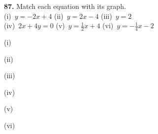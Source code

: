 \documentclass{ximera}
\begin{document}
\begin{problem}
\textbf{87.} Match each equation with its graph.
  \\[3pt]
  \hspace*{1.5em}
  (i)~$y = -2x + 4$ \qquad (ii)~$y = 2x - 4$ \qquad (iii)~$y = 2$
  \\[2pt]
  \hspace*{1.5em}
  (iv)~$2x + 4y = 0$ \qquad (v)~$y = \frac{1}{2}x + 4$ \qquad
  (vi)~$y = -\frac{1}{4}x - 2$

(i)

\begin{multipleChoice}
\end{multipleChoice}


(ii) 

\begin{multipleChoice}
\end{multipleChoice}


(iii) 

\begin{multipleChoice}
\end{multipleChoice}


(iv) 

\begin{multipleChoice}
\end{multipleChoice}


(v) 

\begin{multipleChoice}
\end{multipleChoice}


(vi) 

\begin{multipleChoice}
\end{multipleChoice}
\end{problem}
\end{document}
